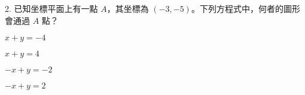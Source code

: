 \documentclass[12pt]{article}
\begin{document}
\begin{problem}
  \item[2.] 已知坐標平面上有一點 $A$，其坐標為 $(-3, -5)$。下列方程式中，何者的圖形會通過 $A$ 點？
  \begin{choices}
    \item $x + y = -4$
    \item $x + y = 4$
    \item $-x + y = -2$
    \item $-x + y = 2$
  \end{choices}
\end{problem}
\end{document}
